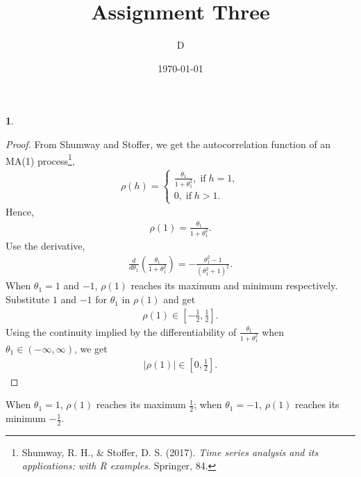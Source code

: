 \documentclass[10pt]{article}
\author{D}
\newtheorem{prob}{\bm{$Problem$}}
\begin{document}
\title{Assignment Three}
\date{\today}
\maketitle
\thispagestyle{fancy}
\thispagestyle{fancy}

\begin{prob}
\end{prob}
\begin{proof}
From Shumway and Stoffer, we get the autocorrelation function of an MA(1) process\footnote{ Shumway, R. H., \& Stoffer, D. S. (2017). \textit{Time series analysis and its applications: with R examples}. Springer, 84.},
\begin{align*}
\rho(h)=\left\{\begin{array}{ll}\frac{\theta_1}{1+\theta_1^2},\;\textrm{if}\;h=1,\\
0,\;\textrm{if}\;h>1.\end{array}\right.
\end{align*}
Hence,
\begin{align*}
\rho(1)=\frac{\theta_1}{1+\theta_1^2}.
\end{align*}
Use the derivative,
\begin{align*}
\frac{d}{d\theta_1}(\frac{\theta_1}{1+\theta_1^2})=-\frac{\theta_1^2-1}{(\theta_1^2+1)^2}.
\end{align*}
When $\theta_1=1$ and $-1$, $\rho(1)$ reaches its maximum and minimum respectively. Substitute $1$ and $-1$ for $\theta_1$ in $\rho(1)$ and get
\begin{align*}
\rho(1)\in[-\frac{1}{2},\frac{1}{2}].
\end{align*}
Using the continuity implied by the differentiability of $\frac{\theta_1}{1+\theta_1^2}$ when $\theta_1\in(-\infty,\infty)$, we get
\begin{align*}
|\rho(1)|\in[0,\frac{1}{2}].
\end{align*}
\end{proof}
When $\theta_1=1$, $\rho(1)$ reaches its maximum $\frac{1}{2}$; when $\theta_1=-1$, $\rho(1)$ reaches its minimum $-\frac{1}{2}$.\\
\vspace{3mm}
\end{document}
